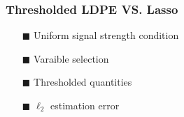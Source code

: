 \begin{frame}
\frametitle{Thresholded LDPE  VS.  Lasso}
\begin{itemize}
\item[$\blacksquare$] Uniform signal strength condition
\medskip
\item[$\blacksquare$] Varaible selection
\medskip
\item[$\blacksquare$] Thresholded quantities
\medskip
\item[$\blacksquare$] $\ell_2$ estimation error




\end{itemize}
\end{frame}

